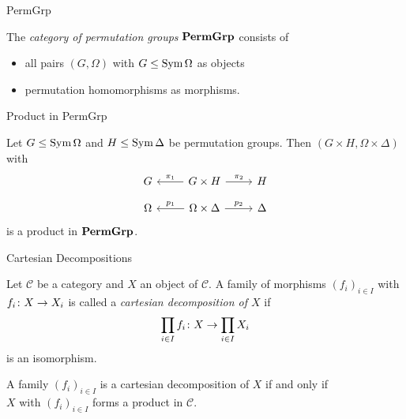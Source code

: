 
\begin{frame}{PermGrp}
    \begin{defn}
        The \emph{category of permutation groups}
        $\mathbf{PermGrp}$
        consists of
        \pause
        \vspace{-0.5em}
        \begin{itemize}
            \item
            all pairs $(G, \Omega)$ with $G \leq \operatorname{Sym} \Omega$ as objects
            \pause
            \item
            permutation homomorphisms as morphisms.
        \end{itemize}
    \end{defn}
\end{frame}


\begin{frame}{Product in PermGrp}
    \begin{lemma}
        Let $G \leq \operatorname{Sym} \Omega$ and $H \leq \operatorname{Sym} \Delta$ be permutation
        groups.
        Then $(G \times H, \Omega \times \Delta)$ with
        \[
        \begin{tikzcd}[ampersand replacement=\&, row sep=small]
            G
            \&
            G \times H
                \ar{l}[above]{\pi_1}
                \ar[r, "\pi_2"]
            \&
            H
            \\
            \Omega
            \&
            \Omega \times \Delta
                \ar{l}[above]{p_1}
                \ar[r, "p_2"]
            \&
            \Delta
        \end{tikzcd}
        \]
        is a product in $\mathbf{PermGrp}$.
    \end{lemma}
\end{frame}

\begin{frame}{Cartesian Decompositions}
    \begin{defn}
        Let $\mathcal C$ be a category and $X$ an object of $\mathcal C$.
        A family of morphisms $(f_i)_{i \in I}$ with
        $f_i \colon X \rightarrow X_i$
        is called a
        \emph{cartesian decomposition of $X$}
        if
        \pause
        \[
            \prod_{i \in I} f_i
            \colon
            X
            \rightarrow
            \prod_{i \in I} X_i
        \]
        is an isomorphism.
    \end{defn}
    \pause

    \begin{lemma}
        A family $(f_i)_{i \in I}$ is a cartesian decomposition of $X$
        if and only if
        \\
        $X$ with $(f_i)_{i \in I}$ forms a product in $\mathcal C$.
    \end{lemma}
\end{frame}

